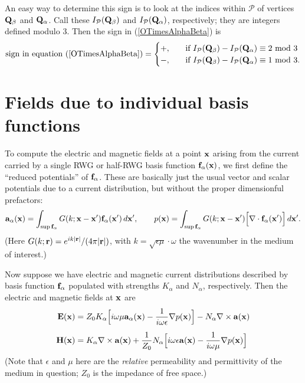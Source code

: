\documentclass[letterpaper]{article}
\begin{document}
An easy way to determine this sign is to look at the 
indices within $\mathcal{P}$ of vertices $\mathbf{Q}_\beta$
and $\mathbf{Q}_\alpha$. Call these $I_{\mathcal{P}}(\mathbf{Q}_\beta)$ and 
$I_{\mathcal{P}}(\mathbf{Q}_\alpha)$, respectively; they are integers
defined modulo 3. Then the sign in (\ref{OTimesAlphaBeta})
is 
$$ \text{sign in equation (\ref{OTimesAlphaBeta})} 
   = 
   \begin{cases}
   +, \quad &\text{if } I_{\mathcal{P}}(\mathbf{Q}_\beta)
                       -I_{\mathcal{P}}(\mathbf{Q}_\alpha)
                        \equiv 2 \text{ mod } 3 
   \\
   -, \quad &\text{if } I_{\mathcal{P}}(\mathbf{Q}_\beta)
                       -I_{\mathcal{P}}(\mathbf{Q}_\alpha)
                        \equiv 1 \text{ mod } 3.
   \end{cases}
$$

\newpage
\section{Fields due to individual basis functions}

To compute the electric and magnetic fields at a point $\mathbf{x}$ 
arising from the current carried by a single RWG or
half-RWG basis function $\mathbf{f}_\alpha(\mathbf{x})$, we first define the
``reduced potentials'' of $\mathbf{f}_\alpha$. These are basically just 
the usual vector and scalar potentials due to a current 
distribution, but without the proper dimensionful prefactors:
$$ \mathbf{a}_\alpha(\mathbf{x}) =
   \int_{\sup \mathbf{f}_\alpha} 
     G(k; \mathbf{x} - \mathbf{x}^\prime) \mathbf{f}_\alpha(\mathbf{x}^\prime) \, d\mathbf{x}^\prime,
   \qquad
   p(\mathbf{x}) =
   \int_{\sup \mathbf{f}_\alpha} G(k; \mathbf{x} - \mathbf{x}^\prime) 
                     \Big[\nabla \cdot \mathbf{f}_\alpha(\mathbf{x}^\prime)\Big] \, d\mathbf{x}^\prime.
$$
(Here $G(k; \mathbf{r})=e^{ik|\mathbf{r}|}/{(4\pi|\mathbf{r}|)}$,
with $k=\sqrt{\epsilon\mu}\cdot \omega$ the wavenumber in the medium 
of interest.)

Now suppose we have electric and magnetic current distributions
described by basis function $\mathbf{f}_\alpha$ populated with strengths $K_\alpha$
and $N_\alpha$, respectively. Then the electric and magnetic fields at
$\mathbf{x}$ are 
\begin{align*}
 \mathbf{E} (\mathbf{x}) 
&= 
  Z_0 K_\alpha \Big[ i\omega \mu \mathbf{a}_\alpha(\mathbf{x}) 
                     - \frac{1}{i\omega \epsilon}\nabla p(\mathbf{x})
               \Big]
 - N_\alpha \nabla \times \mathbf{a}(\mathbf{x})
\\[5pt]
 \mathbf{H}(\mathbf{x}) 
&=
  K_\alpha \nabla \times \mathbf{a}(\mathbf{x})
 +\frac{1}{Z_0}
  N_\alpha \Big[   i\omega \epsilon \mathbf{a}(\mathbf{x}) 
                 - \frac{1}{i\omega \mu }\nabla p(\mathbf{x})
               \Big]
\end{align*}
(Note that $\epsilon$ and $\mu$ here are the \textit{relative}
permeability and permittivity of the medium in question; $Z_0$ 
is the impedance of free space.)
\end{document}
